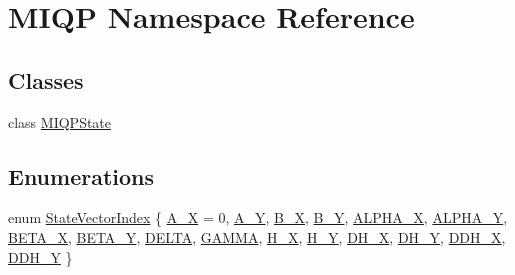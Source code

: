 \hypertarget{namespaceMIQP}{\section{\-M\-I\-Q\-P \-Namespace \-Reference}
\label{namespaceMIQP}
}
\subsection*{\-Classes}
\begin{DoxyCompactItemize}
\item 
class \hyperlink{classMIQP_1_1MIQPState}{\-M\-I\-Q\-P\-State}
\end{DoxyCompactItemize}
\subsection*{\-Enumerations}
\begin{DoxyCompactItemize}
\item 
enum \hyperlink{namespaceMIQP_a437279e763ccbc43c283bfcb0508740b}{\-State\-Vector\-Index} \{ \*
\hyperlink{namespaceMIQP_a437279e763ccbc43c283bfcb0508740ba1dd7a0603c91cedef505a0860ef4495d}{\-A\-\_\-\-X} = 0, 
\hyperlink{namespaceMIQP_a437279e763ccbc43c283bfcb0508740bae5dff190c015e5fbfede209f51989c04}{\-A\-\_\-\-Y}, 
\hyperlink{namespaceMIQP_a437279e763ccbc43c283bfcb0508740ba55d1ab3641b91f8e15f6afac89af6045}{\-B\-\_\-\-X}, 
\hyperlink{namespaceMIQP_a437279e763ccbc43c283bfcb0508740ba096c5f9dbaf1e3c61bd6d66f14cf8217}{\-B\-\_\-\-Y}, 
\*
\hyperlink{namespaceMIQP_a437279e763ccbc43c283bfcb0508740ba803bcffb4eca16a6c5328522d1784fc8}{\-A\-L\-P\-H\-A\-\_\-\-X}, 
\hyperlink{namespaceMIQP_a437279e763ccbc43c283bfcb0508740ba637a22f8a2022fa645fbc506a9b06770}{\-A\-L\-P\-H\-A\-\_\-\-Y}, 
\hyperlink{namespaceMIQP_a437279e763ccbc43c283bfcb0508740ba7bd01e30cce291cb10dea256da0dc7b6}{\-B\-E\-T\-A\-\_\-\-X}, 
\hyperlink{namespaceMIQP_a437279e763ccbc43c283bfcb0508740ba2b4c206667dc4facf08f8da6e83a65e5}{\-B\-E\-T\-A\-\_\-\-Y}, 
\*
\hyperlink{namespaceMIQP_a437279e763ccbc43c283bfcb0508740bafc299c0c771598c52982ef03b1aebe24}{\-D\-E\-L\-T\-A}, 
\hyperlink{namespaceMIQP_a437279e763ccbc43c283bfcb0508740ba8bd8a3b1af1c153cd82657296ca3e0d0}{\-G\-A\-M\-M\-A}, 
\hyperlink{namespaceMIQP_a437279e763ccbc43c283bfcb0508740ba81d2abd664686419a759a8c058302ba8}{\-H\-\_\-\-X}, 
\hyperlink{namespaceMIQP_a437279e763ccbc43c283bfcb0508740bad9c4a04dbd7faa1575ac243c4f774e66}{\-H\-\_\-\-Y}, 
\*
\hyperlink{namespaceMIQP_a437279e763ccbc43c283bfcb0508740ba236b2a998dab2dfdde29454bf6241ca2}{\-D\-H\-\_\-\-X}, 
\hyperlink{namespaceMIQP_a437279e763ccbc43c283bfcb0508740ba90ecfa5c72d59bbf692d367e04ef8bca}{\-D\-H\-\_\-\-Y}, 
\hyperlink{namespaceMIQP_a437279e763ccbc43c283bfcb0508740bac58d231def55dff938cda011ff40d543}{\-D\-D\-H\-\_\-\-X}, 
\hyperlink{namespaceMIQP_a437279e763ccbc43c283bfcb0508740ba4eb2ee8fef770a764e8e14f0445a376f}{\-D\-D\-H\-\_\-\-Y}
 \}
\end{DoxyCompactItemize}


